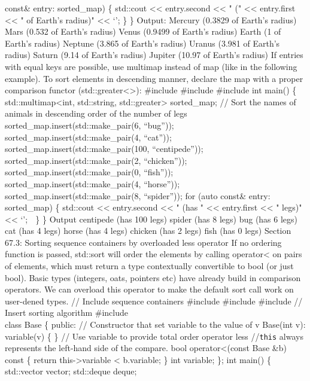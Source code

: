 const\& entry: sorted\_map) \{ std::cout \textless\textless{}
entry.second \textless\textless{} " (" \textless\textless{} entry.first
\textless\textless{} " of Earth's radius)" \textless\textless{} `\n'; \}
\} Output: Mercury (0.3829 of Earth's radius) Mars (0.532 of Earth's
radius) Venus (0.9499 of Earth's radius) Earth (1 of Earth's radius)
Neptune (3.865 of Earth's radius) Uranus (3.981 of Earth's radius)
Saturn (9.14 of Earth's radius) Jupiter (10.97 of Earth's radius) If
entries with equal keys are possible, use multimap instead of map (like
in the following example). To sort elements in descending manner,
declare the map with a proper comparison functor
(std::greater\textless\textgreater): \#include \#include \#include int
main() \{ std::multimap\textless int, std::string,
std::greater\textgreater{} sorted\_map; // Sort the names of animals in
descending order of the number of legs
sorted\_map.insert(std::make\_pair(6, ``bug''));
sorted\_map.insert(std::make\_pair(4, ``cat''));
sorted\_map.insert(std::make\_pair(100, ``centipede''));
sorted\_map.insert(std::make\_pair(2, ``chicken''));
sorted\_map.insert(std::make\_pair(0, ``fish''));
sorted\_map.insert(std::make\_pair(4, ``horse''));
sorted\_map.insert(std::make\_pair(8, ``spider'')); for (auto const\&
entry: sorted\_map) \{ std::cout \textless\textless{} entry.second
\textless\textless{} " (has " \textless\textless{} entry.first
\textless\textless{} " legs)" \textless\textless{} `\n';  \} \} Output
centipede (has 100 legs) spider (has 8 legs) bug (has 6 legs) cat (has 4
legs) horse (has 4 legs) chicken (has 2 legs) fish (has 0 legs) Section
67.3: Sorting sequence containers by overloaded less operator If no
ordering function is passed, std::sort will order the elements by
calling operator\textless{} on pairs of elements, which must return a
type contextually convertible to bool (or just bool). Basic types
(integers, oats, pointers etc) have already build in comparison
operators. We can overload this operator to make the default sort call
work on user-dened types. // Include sequence containers \#include
\#include \#include // Insert sorting algorithm \#include \\
class Base \{ public: // Constructor that set variable to the value of v
Base(int v): variable(v) \{ \} // Use variable to provide total order
operator less //\passthrough{\lstinline!this!} always represents the
left-hand side of the compare. bool operator\textless(const Base \&b)
const \{ return this-\textgreater variable \textless{} b.variable; \}
int variable; \}; int main() \{ std::vector vector; std::deque deque;
